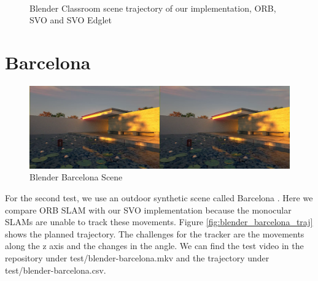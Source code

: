 \documentclass[11pt,a4paper,titlepage,oneside]{report}
\begin{document}
\begin{figure}[H]
  \centering
  \\
  \caption{Blender Classroom scene trajectory of our implementation, ORB, SVO and SVO Edglet}\label{fig:blender_classroom_comp}
\end{figure}

\section{Barcelona}

\begin{figure}[H]
  \includegraphics[width=1.0\textwidth]{img/blender_barcelona_scene.png}
  \caption{Blender Barcelona Scene}\label{fig:blender_barcelona_scene}
\end{figure}

For the second test, we use an outdoor synthetic scene called Barcelona \cite{blender}. Here we compare ORB SLAM with our SVO implementation because the monocular SLAMs are unable to track these movements. Figure \ref{fig:blender_barcelona_traj} shows the planned trajectory. The challenges for the tracker are the movements along the z axis and the changes in the angle. We can find the test video in the repository under test/blender-barcelona.mkv and the trajectory under test/blender-barcelona.csv.
\end{document}
